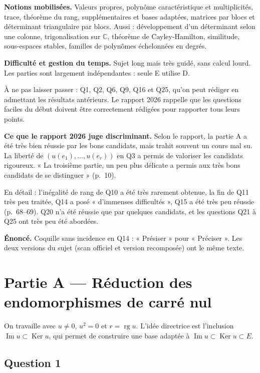 \documentclass[11pt,a4paper]{article}
\begin{document}
\textbf{Notions mobilisées.} Valeurs propres, polynôme caractéristique et multiplicités, trace, théorème du rang, supplémentaires et bases adaptées, matrices par blocs et déterminant triangulaire par blocs. Aussi : développement d'un déterminant selon une colonne, trigonalisation sur \(\mathbb C\), théorème de Cayley-Hamilton, similitude, sous-espaces stables, familles de polynômes échelonnées en degrés.

\textbf{Difficulté et gestion du temps.} Sujet long mais très guidé, sans calcul lourd. Les parties sont largement indépendantes : seule E utilise D.

À ne pas laisser passer : Q1, Q2, Q6, Q9, Q16 et Q25, qu'on peut rédiger en admettant les résultats antérieurs. Le rapport 2026 rappelle que les questions faciles du début doivent être correctement rédigées pour rapporter tous leurs points.

\textbf{Ce que le rapport 2026 juge discriminant.} Selon le rapport, la partie A a été très bien réussie par les bons candidats, mais trahit souvent un cours mal su. La liberté de \((u(e_1),\dots,u(e_r))\) en Q3 a permis de valoriser les candidats rigoureux. « La troisième partie, un peu plus délicate a permis aux très bons candidats de se distinguer » (p.~10).

En détail : l'inégalité de rang de Q10 a été très rarement obtenue, la fin de Q11 très peu traitée, Q14 a posé « d'immenses difficultés », Q15 a été très peu réussie (p.~68--69). Q20 n'a été réussie que par quelques candidats, et les questions Q21 à Q25 ont très peu été abordées.

\textbf{Énoncé.} Coquille sans incidence en Q14 : « Présiser » pour « Préciser ». Les deux versions du sujet (scan officiel et version recomposée) ont le même texte.

\hypertarget{partie-a-ruxe9duction-des-endomorphismes-de-carruxe9-nul}{%
\section{Partie A --- Réduction des endomorphismes de carré nul}\label{partie-a-ruxe9duction-des-endomorphismes-de-carruxe9-nul}}

On travaille avec \(u\neq0\), \(u^2=0\) et \(r=\operatorname{rg}u\). L'idée directrice est l'inclusion \(\operatorname{Im}u\subset\operatorname{Ker}u\), qui permet de construire une base adaptée à \(\operatorname{Im}u\subset\operatorname{Ker}u\subset E\).

\hypertarget{question-1}{%
\subsection{Question 1}\label{question-1}}
\end{document}
